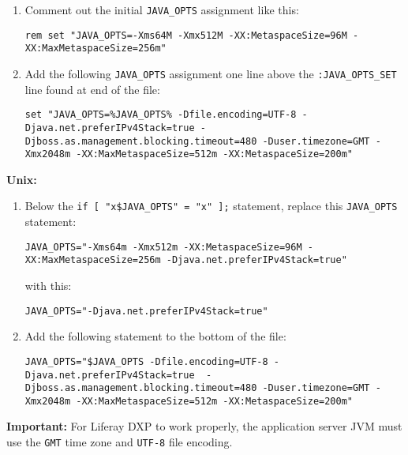 \begin{enumerate}
\def\labelenumi{\arabic{enumi}.}
\item
  Comment out the initial \texttt{JAVA\_OPTS} assignment like this:

\begin{verbatim}
rem set "JAVA_OPTS=-Xms64M -Xmx512M -XX:MetaspaceSize=96M -XX:MaxMetaspaceSize=256m"
\end{verbatim}
\item
  Add the following \texttt{JAVA\_OPTS} assignment one line above the
  \texttt{:JAVA\_OPTS\_SET} line found at end of the file:

\begin{verbatim}
set "JAVA_OPTS=%JAVA_OPTS% -Dfile.encoding=UTF-8 -Djava.net.preferIPv4Stack=true -Djboss.as.management.blocking.timeout=480 -Duser.timezone=GMT -Xmx2048m -XX:MaxMetaspaceSize=512m -XX:MetaspaceSize=200m"
\end{verbatim}
\end{enumerate}

\textbf{Unix:}

\begin{enumerate}
\def\labelenumi{\arabic{enumi}.}
\item
  Below the \texttt{if\ {[}\ "x\$JAVA\_OPTS"\ =\ "x"\ {]};} statement,
  replace this \texttt{JAVA\_OPTS} statement:

\begin{verbatim}
JAVA_OPTS="-Xms64m -Xmx512m -XX:MetaspaceSize=96M -XX:MaxMetaspaceSize=256m -Djava.net.preferIPv4Stack=true"
\end{verbatim}

  with this:

\begin{verbatim}
JAVA_OPTS="-Djava.net.preferIPv4Stack=true"
\end{verbatim}
\item
  Add the following statement to the bottom of the file:

\begin{verbatim}
JAVA_OPTS="$JAVA_OPTS -Dfile.encoding=UTF-8 -Djava.net.preferIPv4Stack=true  -Djboss.as.management.blocking.timeout=480 -Duser.timezone=GMT -Xmx2048m -XX:MaxMetaspaceSize=512m -XX:MetaspaceSize=200m"
\end{verbatim}
\end{enumerate}

\noindent\hrulefill

\textbf{Important:} For Liferay DXP to work properly, the application
server JVM must use the \texttt{GMT} time zone and \texttt{UTF-8} file
encoding.

